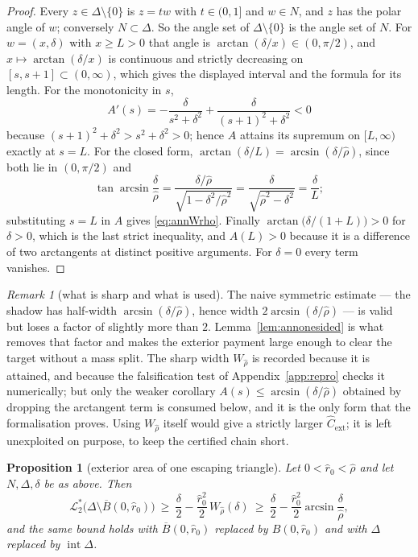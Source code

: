 \documentclass[11pt]{article}
\theoremstyle{plain}
\newtheorem{proposition}[theorem]{Proposition}
\theoremstyle{definition}
\theoremstyle{remark}
\newtheorem{remark}[theorem]{Remark}
\newcommand{\Lout}{\mathcal{L}^{*}_{2}}
\begin{document}
\begin{proof}
Every $z\in\Delta\setminus\{0\}$ is $z=tw$ with $t\in(0,1]$ and $w\in N$, and
$z$ has the polar angle of $w$; conversely $N\subset\Delta$. So the angle set
of $\Delta\setminus\{0\}$ is the angle set of $N$. For $w=(x,\delta)$ with
$x\ge L>0$ that angle is $\arctan(\delta/x)\in(0,\pi/2)$, and
$x\mapsto\arctan(\delta/x)$ is continuous and strictly decreasing on
$[s,s+1]\subset(0,\infty)$, which gives the displayed interval and the formula
for its length. For the monotonicity in $s$,
\[
  A'(s)=-\frac{\delta}{s^{2}+\delta^{2}}+\frac{\delta}{(s+1)^{2}+\delta^{2}}<0
\]
because $(s+1)^{2}+\delta^{2}>s^{2}+\delta^{2}>0$; hence $A$ attains its
supremum on $[L,\infty)$ exactly at $s=L$. For the closed form,
$\arctan(\delta/L)=\arcsin(\delta/\hat\rho)$, since both lie in $(0,\pi/2)$ and
\[
  \tan\arcsin\frac{\delta}{\hat\rho}
  =\frac{\delta/\hat\rho}{\sqrt{1-\delta^{2}/\hat\rho^{2}}}
  =\frac{\delta}{\sqrt{\hat\rho^{2}-\delta^{2}}}=\frac{\delta}{L};
\]
substituting $s=L$ in $A$ gives \eqref{eq:annWrho}. Finally
$\arctan\bigl(\delta/(1+L)\bigr)>0$ for $\delta>0$, which is the last strict
inequality, and $A(L)>0$ because it is a difference of two arctangents at
distinct positive arguments. For $\delta=0$ every term vanishes.
\end{proof}

\begin{remark}[what is sharp and what is used]\label{rem:annweak}
The naive symmetric estimate --- the shadow has half-width
$\arcsin(\delta/\hat\rho)$, hence width $2\arcsin(\delta/\hat\rho)$ --- is
valid but loses a factor of slightly more than $2$. Lemma~\ref{lem:annonesided}
is what removes that factor and makes the exterior payment large enough to
clear the target without a mass split. The sharp width $W_{\hat\rho}$ is
recorded because it is attained, and because the falsification test of
Appendix~\ref{app:repro} checks it numerically; but only the weaker corollary
$A(s)\le\arcsin(\delta/\hat\rho)$ obtained by dropping the arctangent term is
consumed below, and it is the only form that the formalisation proves. Using
$W_{\hat\rho}$ itself would give a strictly larger $\hat C_{\mathrm{ext}}$; it
is left unexploited on purpose, to keep the certified chain short.
\end{remark}

\begin{proposition}[exterior area of one escaping triangle]\label{prop:annexterior}
Let $0<\hat r_{0}<\hat\rho$ and let $N,\Delta,\delta$ be as above. Then
\begin{equation}\label{eq:annexterior}
  \Lout\bigl(\Delta\setminus\overline B(0,\hat r_{0})\bigr)
  \ \ge\ \frac{\delta}{2}-\frac{\hat r_{0}^{2}}{2}\,W_{\hat\rho}(\delta)
  \ \ge\ \frac{\delta}{2}
    -\frac{\hat r_{0}^{2}}{2}\arcsin\frac{\delta}{\hat\rho},
\end{equation}
and the same bound holds with $\overline B(0,\hat r_{0})$ replaced by
$B(0,\hat r_{0})$ and with $\Delta$ replaced by $\operatorname{int}\Delta$.
\end{proposition}
\end{document}
